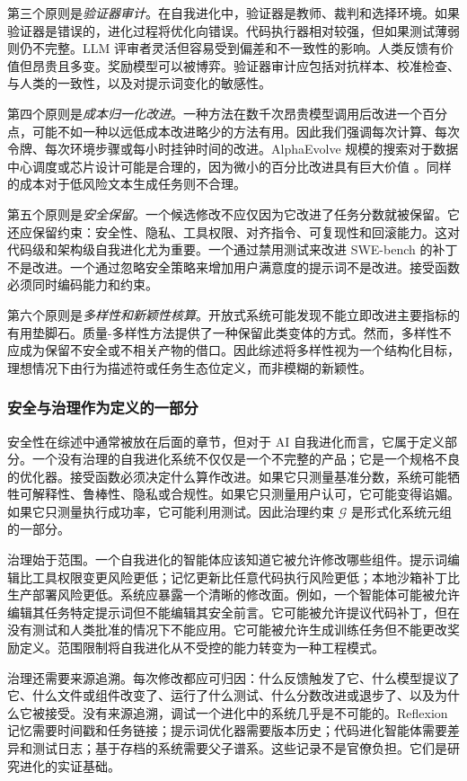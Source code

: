 第三个原则是\emph{验证器审计}。在自我进化中，验证器是教师、裁判和选择环境。如果验证器是错误的，进化过程将优化向错误。代码执行器相对较强，但如果测试薄弱则仍不完整。LLM 评审者灵活但容易受到偏差和不一致性的影响。人类反馈有价值但昂贵且多变。奖励模型可以被博弈。验证器审计应包括对抗样本、校准检查、与人类的一致性，以及对提示词变化的敏感性。

第四个原则是\emph{成本归一化改进}。一种方法在数千次昂贵模型调用后改进一个百分点，可能不如一种以远低成本改进略少的方法有用。因此我们强调每次计算、每次令牌、每次环境步骤或每小时挂钟时间的改进。AlphaEvolve 规模的搜索对于数据中心调度或芯片设计可能是合理的，因为微小的百分比改进具有巨大价值 \cite{alphaevolve2025}。同样的成本对于低风险文本生成任务则不合理。

第五个原则是\emph{安全保留}。一个候选修改不应仅因为它改进了任务分数就被保留。它还应保留约束：安全性、隐私、工具权限、对齐指令、可复现性和回滚能力。这对代码级和架构级自我进化尤为重要。一个通过禁用测试来改进 SWE-bench 的补丁不是改进。一个通过忽略安全策略来增加用户满意度的提示词不是改进。接受函数必须同时编码能力和约束。

第六个原则是\emph{多样性和新颖性核算}。开放式系统可能发现不能立即改进主要指标的有用垫脚石。质量-多样性方法提供了一种保留此类变体的方式。然而，多样性不应成为保留不安全或不相关产物的借口。因此综述将多样性视为一个结构化目标，理想情况下由行为描述符或任务生态位定义，而非模糊的新颖性。

\subsubsection{安全与治理作为定义的一部分}

安全性在综述中通常被放在后面的章节，但对于 AI 自我进化而言，它属于定义部分。一个没有治理的自我进化系统不仅仅是一个不完整的产品；它是一个规格不良的优化器。接受函数必须决定什么算作改进。如果它只测量基准分数，系统可能牺牲可解释性、鲁棒性、隐私或合规性。如果它只测量用户认可，它可能变得谄媚。如果它只测量执行成功率，它可能利用测试。因此治理约束 $\mathcal{G}$ 是形式化系统元组的一部分。

治理始于范围。一个自我进化的智能体应该知道它被允许修改哪些组件。提示词编辑比工具权限变更风险更低；记忆更新比任意代码执行风险更低；本地沙箱补丁比生产部署风险更低。系统应暴露一个清晰的修改面。例如，一个智能体可能被允许编辑其任务特定提示词但不能编辑其安全前言。它可能被允许提议代码补丁，但在没有测试和人类批准的情况下不能应用。它可能被允许生成训练任务但不能更改奖励定义。范围限制将自我进化从不受控的能力转变为一种工程模式。

治理还需要来源追溯。每次修改都应可归因：什么反馈触发了它、什么模型提议了它、什么文件或组件改变了、运行了什么测试、什么分数改进或退步了、以及为什么它被接受。没有来源追溯，调试一个进化中的系统几乎是不可能的。Reflexion 记忆需要时间戳和任务链接；提示词优化器需要版本历史；代码进化智能体需要差异和测试日志；基于存档的系统需要父子谱系。这些记录不是官僚负担。它们是研究进化的实证基础。

